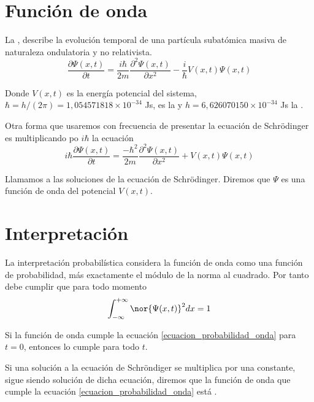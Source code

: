 \section{Función de onda}
\begin{definicion}
La , describe la evolución temporal de una partícula subatómica masiva de naturaleza ondulatoria y no relativista.
\begin{equation}\label{ecuacion_schrodinger}
	\frac{\partial\Psi(x,t)}{\partial t}=\frac{i\hbar}{2m}\frac{\partial^2\Psi(x,t)}{\partial x^2}-\frac{i}{\hbar}V(x,t)\Psi(x,t)
\end{equation}
\end{definicion}
Donde $V(x,t)$ es la energía potencial del sistema, $\hbar = h/(2\pi)=1,054571818\times 10^{-34}$ Js, es la \label{constante_dirac} y $h = 6,626070150 \times 10^{-34}$ Js la \label{constante_planck}.

Otra forma que usaremos con frecuencia de presentar la ecuación de Schrödinger es multiplicando po $i\hbar$ la ecuación
\begin{equation}\label{ecuacion_schrodinger_alternativa}
i\hbar\frac{\partial\Psi(x,t)}{\partial t}=\frac{-\hbar^2}{2m}\frac{\partial^2\Psi(x,t)}{\partial x^2}+V(x,t)\Psi(x,t)
\end{equation}
\begin{definicion}
Llamamos \label{funcion_onda} a las soluciones de la ecuación de Schrödinger. Diremos que $\Psi$ es una función de onda del potencial $V(x,t)$.
\end{definicion}

\section{Interpretación}
La interpretación probabilística considera la función de onda como una función de probabilidad, más exactamente el módulo de la norma al cuadrado. Por tanto debe cumplir que para todo momento
\begin{equation}\label{ecuacion_probabilidad_onda}
\int_{-\infty}^{+\infty}\nor{\Psi(x,t)}^2 dx=1
\end{equation}
\begin{resultado}
	Si la función de onda cumple la ecuación \ref{ecuacion_probabilidad_onda} para $t=0$, entonces lo cumple para todo $t$.
\end{resultado}

Si una solución a la ecuación de Schröndiger se multiplica por una constante, sigue siendo solución de dicha ecuación, diremos que la función de onda que cumple la ecuación \ref{ecuacion_probabilidad_onda} está .

